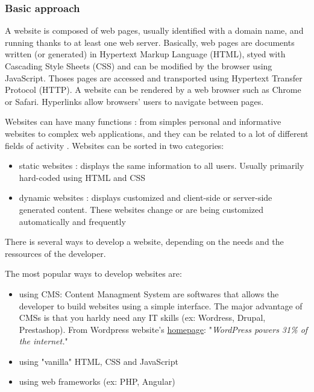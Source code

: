\documentclass{article}
\begin{document}
                    \subsubsection{Basic approach}
                        A website is composed of web pages, usually identified with a domain name, and running thanks to
                        at least one web server. Basically, web pages are documents written (or generated) in Hypertext 
                        Markup Language (HTML), styed with Cascading Style Sheets (CSS) and can be modified by the browser using JavaScript. 
                        Thoses pages are accessed and transported using Hypertext Transfer Protocol (HTTP).
                        A website can be rendered by a web browser such as Chrome or Safari. Hyperlinks allow browsers' users to
                        navigate between pages.

                        Websites can have many functions : from simples personal and informative websites to complex web applications,
                        and they can be related to a lot of different fields of activity \cite{fields}.
                        Websites can be sorted in two categories:
                            \begin{itemize}
                                \item{static websites : displays the same information to all users. Usually primarily hard-coded using HTML and CSS}
                                \item{dynamic websites : displays customized and client-side or server-side generated content. These websites change or are being customized
                                automatically and frequently}
                            \end{itemize}
                        There is several ways to develop a website, depending on the needs and the ressources of the developer.

                        The most popular ways to develop websites are:
                            \begin{itemize}     
                                \item{using CMS: Content Managment System are softwares that allows the developer to build websites
                                using a simple interface.
                                The major advantage of CMSs is that you harldy need any IT skills (ex: Wordress, Drupal, Prestashop).
                                From Wordpress website's \href{https://en.wordpress.com/#hp-jetpack}{homepage}: "\textit{WordPress powers 31\% of the internet.}"
                                }
                                \item{using "vanilla" HTML, CSS and JavaScript}
                                \item{using web frameworks (ex: PHP, Angular)}
                            \end{itemize}       
\end{document}
